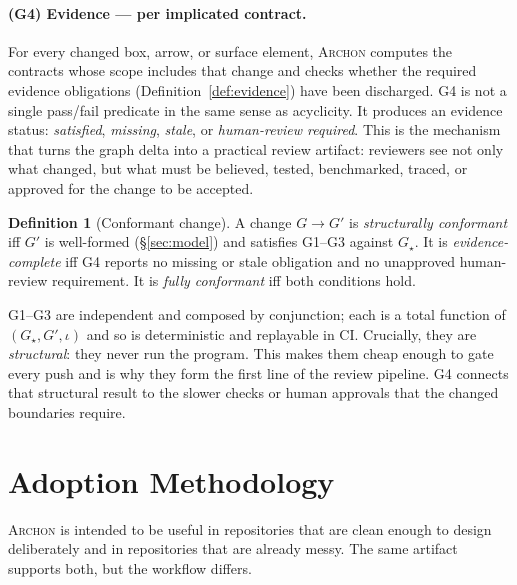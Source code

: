 \documentclass[sigconf,review,anonymous]{acmart}
\theoremstyle{plain}
\theoremstyle{definition}
\newtheorem{definition}[theorem]{Definition}
\begin{document}
\paragraph{(G4) Evidence --- per implicated contract.}
For every changed box, arrow, or surface element, \textsc{Archon} computes the contracts
whose scope includes that change and checks whether the required evidence
obligations (Definition~\ref{def:evidence}) have been discharged. G4 is not a
single pass/fail predicate in the same sense as acyclicity. It produces an
evidence status: \emph{satisfied}, \emph{missing}, \emph{stale}, or
\emph{human-review required}. This is the mechanism that turns the graph delta
into a practical review artifact: reviewers see not only what changed, but what
must be believed, tested, benchmarked, traced, or approved for the change to be
accepted.

\begin{definition}[Conformant change]\label{def:conformant}
A change $G \to G'$ is \emph{structurally conformant} iff $G'$ is well-formed
(\S\ref{sec:model}) and satisfies G1--G3 against $G_\star$. It is
\emph{evidence-complete} iff G4 reports no missing or stale obligation and no
unapproved human-review requirement. It is \emph{fully conformant} iff both
conditions hold.
\end{definition}

G1--G3 are independent and composed by conjunction; each is a total function of
$(G_\star, G', \iota)$ and so is deterministic and replayable in CI. Crucially,
they are \emph{structural}: they never run the program. This makes them cheap
enough to gate every push and is why they form the first line of the review
pipeline. G4 connects that structural result to the slower checks or human
approvals that the changed boundaries require.

\section{Adoption Methodology}\label{sec:adoption}

\textsc{Archon} is intended to be useful in repositories that are clean enough
to design deliberately and in repositories that are already messy. The same
artifact supports both, but the workflow differs.
\end{document}
